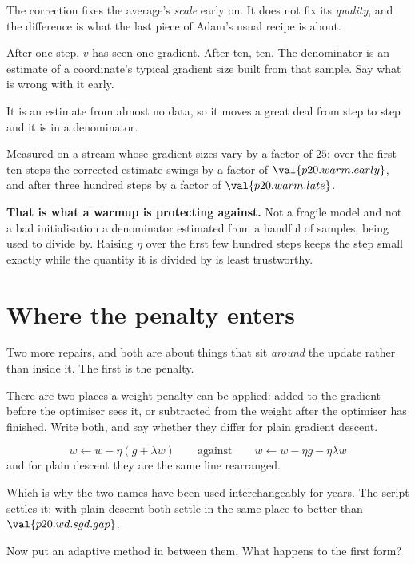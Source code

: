 \begin{fr}
The correction fixes the average's \emph{scale} early on. It does not fix its
\emph{quality}, and the difference is what the last piece of Adam's usual
recipe is about.

After one step, $v$ has seen one gradient. After ten, ten. The denominator is
an estimate of a coordinate's typical gradient size built from that sample.
Say what is wrong with it early.
\nextframe
\end{fr}

\begin{fr}
\begin{ansblock}
It is an estimate from almost no data, so it moves a great deal from step to
step \dash{} and it is in a denominator.
\end{ansblock}

Measured on a stream whose gradient sizes vary by a factor of $25$: over the
first ten steps the corrected estimate swings by a factor of
$\val{p20.warm.early}$, and after three hundred steps by a factor of
$\val{p20.warm.late}$.

\textbf{That is what a warmup is protecting against.} Not a fragile model and
not a bad initialisation \dash{} a denominator estimated from a handful of
samples, being used to divide by. Raising $\eta$ over the first few hundred
steps keeps the step small exactly while the quantity it is divided by is
least trustworthy.
\end{fr}

\section{Where the penalty enters}
\label{sec:P20-decay}

\begin{fr}
Two more repairs, and both are about things that sit \emph{around} the update
rather than inside it. The first is the penalty.

There are two places a weight penalty can be applied: added to the gradient
before the optimiser sees it, or subtracted from the weight after the
optimiser has finished. Write both, and say whether they differ for plain
gradient descent.
\dotline
\nextframe
\end{fr}

\begin{fr}
\begin{ansblock}
\[ w \leftarrow w - \eta(g + \lambda w) \qquad\text{against}\qquad
   w \leftarrow w - \eta g - \eta\lambda w \]
and for plain descent they are the same line rearranged.
\end{ansblock}

Which is why the two names have been used interchangeably for years. The
script settles it: with plain descent both settle in the same place to better
than $\val{p20.wd.sgd.gap}$.


Now put an adaptive method in between them. What happens to the first form?
\nextframe
\end{fr}

